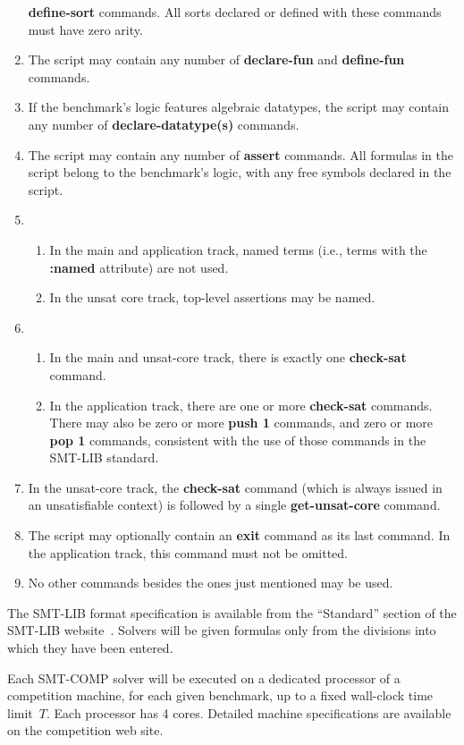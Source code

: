 \documentclass[12pt]{article}
\newcommand{\akey}[1]{\textbf{#1}}
\begin{document}
\begin{enumerate}
  \akey{define-sort} commands.  All sorts declared or defined with
  these commands must have zero arity.
\item The script may contain any number of \akey{declare-fun} and
  \akey{define-fun} commands.
\item If the benchmark's logic features algebraic datatypes, the
  script may contain any number of \akey{declare-datatype(s)}
  commands.
\item The script may contain any number of \akey{assert} commands.
  All formulas in the script belong to the benchmark's logic, with any
  free symbols declared in the script.
\item
  \begin{enumerate}
    \item In the main and application track, named terms (i.e., terms
      with the \akey{:named} attribute) are not used.
    \item In the unsat core track, top-level assertions may be named.
  \end{enumerate}
\item
  \begin{enumerate}
  \item In the main and unsat-core track, there is exactly one
    \akey{check-sat} command.
  \item In the application track, there are one or more
    \akey{check-sat} commands.  There may also be zero or more
    \akey{push 1} commands, and zero or more \akey{pop 1} commands,
    consistent with the use of those commands in the SMT-LIB standard.
  \end{enumerate}
\item In the unsat-core track, the \akey{check-sat} command (which is
  always issued in an unsatisfiable context) is followed by a single
  \akey{get-unsat-core} command.
\item The script may optionally contain an \akey{exit} command as its
  last command.  In the application track, this command must not be
  omitted.
\item No other commands besides the ones just mentioned may be used.
\end{enumerate}
%
The SMT-LIB format specification is available from the ``Standard''
section of the SMT-LIB website~\cite{SMT-LIB}.  Solvers will be given
formulas only from the divisions into which they have been entered.

%
Each SMT-COMP solver will be executed on a dedicated processor of a
competition machine, for each given benchmark, up to a fixed
wall-clock time limit~$T$.  Each processor has 4 cores.  Detailed
machine specifications are available on the competition web site.
\end{document}
